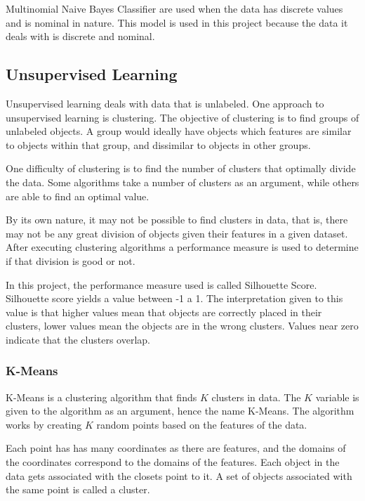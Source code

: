 Multinomial Naive Bayes Classifier are used when the data has discrete values
and is nominal in nature. This model is used in this project because the data
it deals with is discrete and nominal.~\cite{book_ml,book_dm_practical}

\subsection{Unsupervised Learning}

Unsupervised learning deals with data that is unlabeled. One approach to
unsupervised learning is clustering. The objective of clustering is to find
groups of unlabeled objects. A group would ideally have objects which features
are similar to objects within that group, and dissimilar to objects in other
groups.

One difficulty of clustering is to find the number of clusters that optimally
divide the data. Some algorithms take a number of clusters as an argument,
while others are able to find an optimal value.

By its own nature, it may not be possible to find clusters in data, that is,
there may not be any great division of objects given their features in a given
dataset. After executing clustering algorithms a performance measure is used to
determine if that division is good or not.

In this project, the performance measure used is called Silhouette Score.
Silhouette score yields a value between -1 a 1. The interpretation given to
this value is that higher values mean that objects are correctly placed in
their clusters, lower values mean the objects are in the wrong clusters. Values
near zero indicate that the clusters overlap.~\cite{book_ml,book_dm_practical}

\subsubsection{K-Means}

K-Means is a clustering algorithm that finds $ K $ clusters in data. The $ K $
variable is given to the algorithm as an argument, hence the name K-Means. The
algorithm works by creating $ K $ random points based on the features of the
data.

Each point has has many coordinates as there are features, and the domains of
the coordinates correspond to the domains of the features. Each object in the
data gets associated with the closets point to it. A set of objects associated
with the same point is called a cluster.

